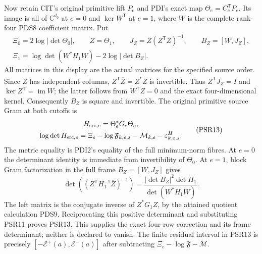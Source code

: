 \documentclass[10pt]{article}
\begin{document}
Now retain CIT's original primitive lift $P_e$ and PDI's exact map
$\Theta_e=C_e^{\mathsf T}P_e$. Its image is all of $\mathbb C^{d_0}$
at $e=0$ and $\ker W^{\mathsf T}$ at $e=1$, where $W$ is the complete
rank-four PDS8 coefficient matrix. Put
\[
\begin{gathered}
 \Xi_0=2\log|\det\Theta_0|,\qquad Z=\Theta_1,\qquad
 J_Z=\overline Z(Z^{\mathsf T}\overline Z)^{-1},\qquad
 B_Z=[W,J_Z],\\
 \Xi_1=\log\det(W^*H_1W)-2\log|\det B_Z|.
\end{gathered}\tag{PSR12}
\]
All matrices in this display are the actual matrices for the specified
source order. Since $Z$ has independent columns,
$Z^{\mathsf T}\overline Z=\overline{Z^*Z}$ is invertible.
Thus $Z^{\mathsf T}J_Z=I$ and
$\ker Z^{\mathsf T}=\operatorname{im}W$; the latter follows from
$W^{\mathsf T}Z=0$ and the exact four-dimensional kernel.
Consequently $B_Z$ is square and invertible. The original primitive
source Gram at both cutoffs is
\[
\begin{gathered}
 H_{{\rm src},e}=\Theta_e^*G_e\Theta_e,\\
 \log\det H_{{\rm src},e}
   =\Xi_e-\log\mathfrak F_{k,e,s}-\mathcal M_{k,e}
                             -\varepsilon^H_{k,e,s}.
\end{gathered}\tag{PSR13}
\]
The metric equality is PDI2's equality of the full minimum-norm fibres.
At $e=0$ the determinant identity is immediate from invertibility of
$\Theta_0$. At $e=1$, block Gram factorization in the full frame
$B_Z=[W,J_Z]$ gives
\[
 \det((Z^{\mathsf T}H_1^{-1}\overline Z)^{-1})
    =\frac{|\det B_Z|^2\det H_1}{\det(W^*H_1W)}.
\]
The left matrix is the conjugate inverse of $Z^*G_1Z$, by the
attained quotient calculation PDS9. Reciprocating this positive
determinant and substituting PSR11 proves PSR13. This supplies the
exact four-row correction and its frame determinant; neither is
declared to vanish. The finite residual interval in PSR13 is precisely
$[-\mathcal E^+(a),\mathcal E^-(a)]$ after subtracting
$\Xi_e-\log\mathfrak F-\mathcal M$.
\end{document}
